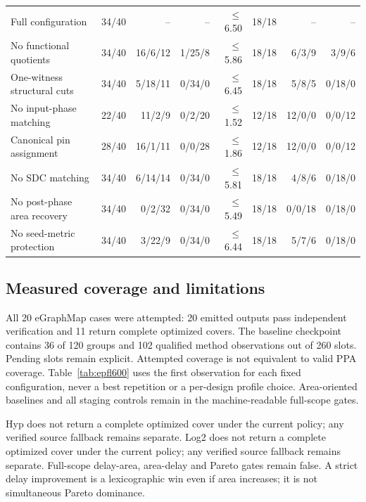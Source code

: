 \documentclass[conference]{IEEEtran}
\begin{document}
\begin{table}[!t]
\begin{tabular}{lrrrrrrr}
Full configuration & 34/40 & -- & -- & $\leq$6.50 & 18/18 & -- & -- \\
No functional quotients & 34/40 & 16/6/12 & 1/25/8 & $\leq$5.86 & 18/18 & 6/3/9 & 3/9/6 \\
One-witness structural cuts & 34/40 & 5/18/11 & 0/34/0 & $\leq$6.45 & 18/18 & 5/8/5 & 0/18/0 \\
No input-phase matching & 22/40 & 11/2/9 & 0/2/20 & $\leq$1.52 & 12/18 & 12/0/0 & 0/0/12 \\
Canonical pin assignment & 28/40 & 16/1/11 & 0/0/28 & $\leq$1.86 & 12/18 & 12/0/0 & 0/0/12 \\
No SDC matching & 34/40 & 6/14/14 & 0/34/0 & $\leq$5.81 & 18/18 & 4/8/6 & 0/18/0 \\
No post-phase area recovery & 34/40 & 0/2/32 & 0/34/0 & $\leq$5.49 & 18/18 & 0/0/18 & 0/18/0 \\
No seed-metric protection & 34/40 & 3/22/9 & 0/34/0 & $\leq$6.44 & 18/18 & 5/7/6 & 0/18/0 \\
\bottomrule\end{tabular}\end{table}\subsection{Measured coverage and limitations}
All 20 eGraphMap cases were attempted: 20 emitted outputs pass independent verification and 11 return complete optimized covers. The baseline checkpoint contains 36 of 120 groups and 102 qualified method observations out of 260 slots. Pending slots remain explicit. Attempted coverage is not equivalent to valid PPA coverage. Table~\ref{tab:epfl600} uses the first observation for each fixed configuration, never a best repetition or a per-design profile choice. Area-oriented baselines and all staging controls remain in the machine-readable full-scope gates.

Hyp does not return a complete optimized cover under the current policy; any verified source fallback remains separate. Log2 does not return a complete optimized cover under the current policy; any verified source fallback remains separate. Full-scope delay-area, area-delay and Pareto gates remain false. A strict delay improvement is a lexicographic win even if area increases; it is not simultaneous Pareto dominance.
\end{document}
